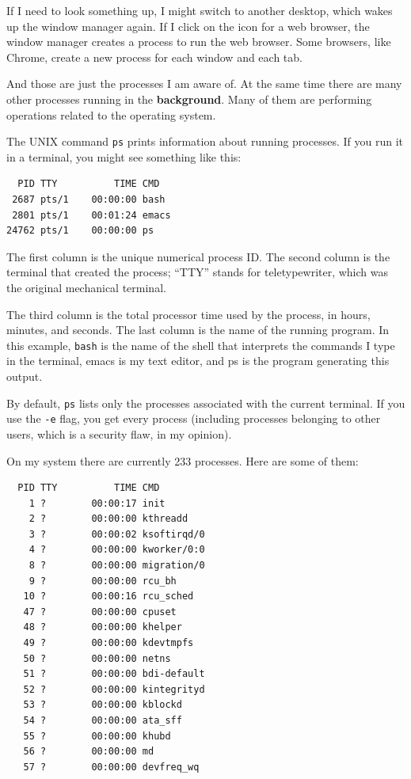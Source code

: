 \documentclass[12pt]{book}
\begin{document}
{If I need to look something up, I might switch to another desktop,
which wakes up the window manager again.  If I click on the icon for a
web browser, the window manager creates a process to run the web
browser.  Some browsers, like Chrome, create a new process for each
window and each tab.

And those are just the processes I am aware of.  At the same time
there are many other processes running in the {\bf background}.
Many of them are performing operations related to the operating
system.

The UNIX command {\tt ps} prints information about running processes.
If you run it in a terminal, you might see something like this:

\begin{verbatim}
  PID TTY          TIME CMD
 2687 pts/1    00:00:00 bash
 2801 pts/1    00:01:24 emacs
24762 pts/1    00:00:00 ps
\end{verbatim}

The first column is the unique numerical process ID.  The second
column is the terminal that created the process; 
``TTY'' stands for teletypewriter, which was the original
mechanical terminal.

The third column is the total processor time used by the process,
in hours, minutes, and seconds.
The last column is the name of the running program.  In
this example, {\tt bash} is the name of the shell that interprets
the commands I type in the terminal, emacs is my text editor, and
ps is the program generating this output.

By default, {\tt ps} lists only the processes associated with
the current terminal.  If you use the {\tt -e} flag, you get every
process (including processes belonging to other users, which is
a security flaw, in my opinion).

On my system there are currently 233 processes.
Here are some of them:

\begin{verbatim}
  PID TTY          TIME CMD
    1 ?        00:00:17 init
    2 ?        00:00:00 kthreadd
    3 ?        00:00:02 ksoftirqd/0
    4 ?        00:00:00 kworker/0:0
    8 ?        00:00:00 migration/0
    9 ?        00:00:00 rcu_bh
   10 ?        00:00:16 rcu_sched
   47 ?        00:00:00 cpuset
   48 ?        00:00:00 khelper
   49 ?        00:00:00 kdevtmpfs
   50 ?        00:00:00 netns
   51 ?        00:00:00 bdi-default
   52 ?        00:00:00 kintegrityd
   53 ?        00:00:00 kblockd
   54 ?        00:00:00 ata_sff
   55 ?        00:00:00 khubd
   56 ?        00:00:00 md
   57 ?        00:00:00 devfreq_wq
\end{verbatim}

}
\end{document}
